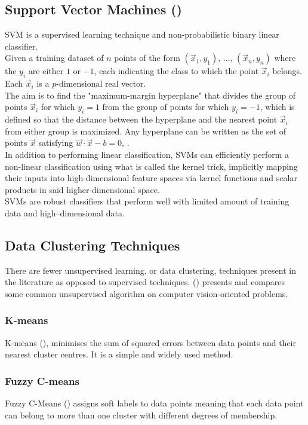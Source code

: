 \documentclass{kththesis}
\begin{document}
\subsection{Support Vector Machines (\textcite{libsvm})} 
SVM is a supervised learning technique and non-probabilistic binary linear classifier. \\
Given a training dataset of $n$ points of the form
$(\vec{x}_{1},y_{1}),\,\ldots ,\,(\vec{x}_{n},y_{n})$ 
where the $y_{i} $ are either $1$ or $-1$, each indicating the class to which the point  $\vec {x}_{i}$ belongs. Each $\vec {x}_{i}$ is a $p$-dimensional real vector. \\
The aim is to find the "maximum-margin hyperplane" that divides the group of points $\vec {x}_{i}$  for which $y_{i}=1$ from the group of points for which $y_{i}=-1$, which is defined so that the distance between the hyperplane and the nearest point $\vec {x}_{i}$ from either group is maximized.
Any hyperplane can be written as the set of points $\vec {x}$ satisfying $\vec {w}\cdot {\vec {x}}-b=0,\,$. \\ 

In addition to performing linear classification, SVMs can efficiently perform a non-linear classification using what is called the kernel trick, implicitly mapping their inputs into high-dimensional feature spaces via kernel functions and scalar products in said higher-dimensional space. \\ 
SVMs are robust classifiers that perform well with limited amount of training data and high–dimensional data.



\subsection{Data Clustering Techniques}
\label{sec:clustering_algos}
There are fewer unsupervised learning, or data clustering, techniques present in the literature as opposed to supervised techniques. 
(\textcite{ClusteringTechniques}) presents and compares some common unsupervised algorithm on computer vision-oriented problems. 
\subsubsection{K-means}
K-means (\textcite{K-means}), minimises the sum of squared errors between data points and their
nearest cluster centres. It is a simple and widely used method. 
\subsubsection{Fuzzy C-means}
Fuzzy C-Means (\textcite{Fuzzycmeans}) assigns soft labels to data points meaning that each data point
can belong to more than one cluster with different degrees of membership.
\end{document}
